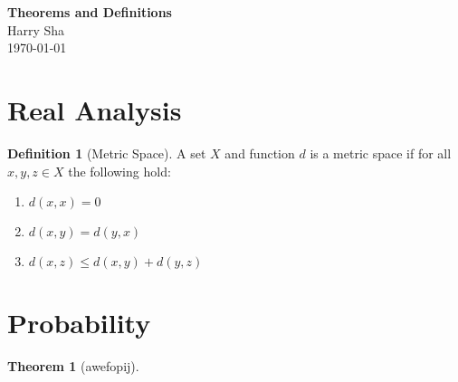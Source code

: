 \documentclass[12pt]{article}
\newtheorem{theorem}{Theorem}[section]
\theoremstyle{definition}
\newtheorem{definition}{Definition}[section]
\begin{document}
\begin{center}
    {\Huge \bf \color{titlecolor} Theorems and Definitions} \\ \vspace{1em}
    {Harry Sha} \\ \vspace{0.5em}
    {\today}
\end{center}

\tableofcontents

\section{Real Analysis}

\begin{definition}[Metric Space]
A set $X$ and function $d$ is a metric space if for all $x, y, z \in X$ the following hold:
    \begin{enumerate}
        \item $d(x, x) = 0$
        \item $d(x, y) = d(y, x)$
        \item $d(x, z) \leq d(x, y) + d(y, z)$
    \end{enumerate}
\end{definition}

\section{Probability}
\begin{theorem}[awefopij]

\end{theorem}
    
\end{document}
